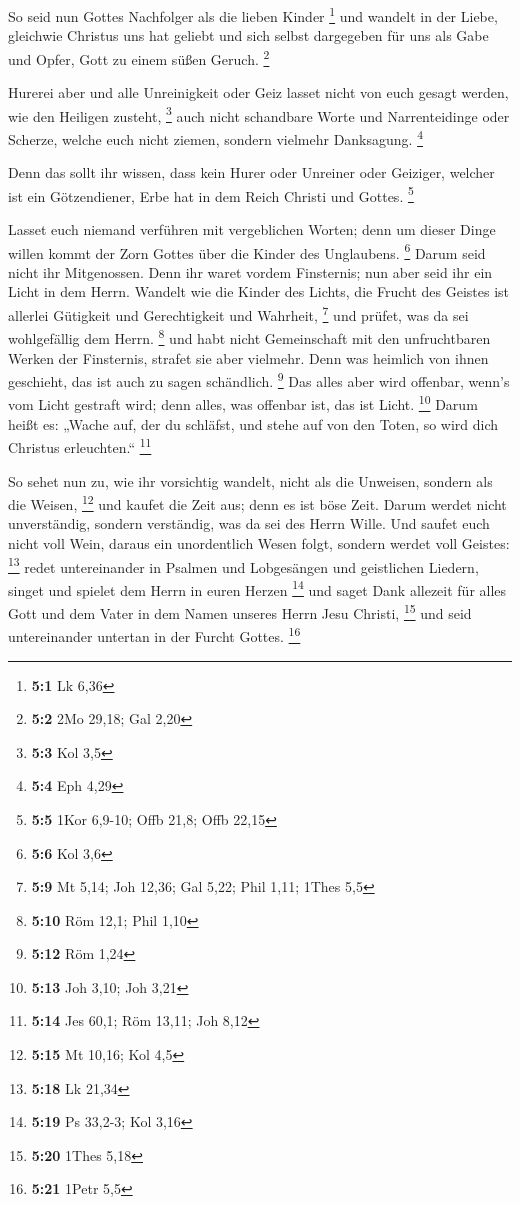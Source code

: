  So seid nun Gottes Nachfolger als die lieben Kinder
\footnote{\textbf{5:1} Lk 6,36}  und wandelt in der Liebe,
gleichwie Christus uns hat geliebt und sich selbst dargegeben für uns
als Gabe und Opfer, Gott zu einem süßen Geruch. \footnote{\textbf{5:2}
  2Mo 29,18; Gal 2,20}

 Hurerei aber und alle Unreinigkeit oder Geiz lasset nicht
von euch gesagt werden, wie den Heiligen zusteht, \footnote{\textbf{5:3}
  Kol 3,5}  auch nicht schandbare Worte und Narrenteidinge
oder Scherze, welche euch nicht ziemen, sondern vielmehr Danksagung.
\footnote{\textbf{5:4} Eph 4,29}

 Denn das sollt ihr wissen, dass kein Hurer oder Unreiner
oder Geiziger, welcher ist ein Götzendiener, Erbe hat in dem Reich
Christi und Gottes. \footnote{\textbf{5:5} 1Kor 6,9-10; Offb 21,8; Offb
  22,15}

 Lasset euch niemand verführen mit vergeblichen Worten;
denn um dieser Dinge willen kommt der Zorn Gottes über die Kinder des
Unglaubens. \footnote{\textbf{5:6} Kol 3,6}  Darum seid
nicht ihr Mitgenossen.  Denn ihr waret vordem Finsternis;
nun aber seid ihr ein Licht in dem Herrn.  Wandelt wie die
Kinder des Lichts, die Frucht des Geistes ist allerlei Gütigkeit und
Gerechtigkeit und Wahrheit, \footnote{\textbf{5:9} Mt 5,14; Joh 12,36;
  Gal 5,22; Phil 1,11; 1Thes 5,5}  und prüfet, was da sei
wohlgefällig dem Herrn. \footnote{\textbf{5:10} Röm 12,1; Phil 1,10}
 und habt nicht Gemeinschaft mit den unfruchtbaren Werken
der Finsternis, strafet sie aber vielmehr.  Denn was
heimlich von ihnen geschieht, das ist auch zu sagen schändlich.
\footnote{\textbf{5:12} Röm 1,24}  Das alles aber wird
offenbar, wenn's vom Licht gestraft wird; denn alles, was offenbar ist,
das ist Licht. \footnote{\textbf{5:13} Joh 3,10; Joh 3,21}
 Darum heißt es: „Wache auf, der du schläfst, und stehe
auf von den Toten, so wird dich Christus erleuchten.`` \footnote{\textbf{5:14}
  Jes 60,1; Röm 13,11; Joh 8,12}

 So sehet nun zu, wie ihr vorsichtig wandelt, nicht als
die Unweisen, sondern als die Weisen, \footnote{\textbf{5:15} Mt 10,16;
  Kol 4,5}  und kaufet die Zeit aus; denn es ist böse
Zeit.  Darum werdet nicht unverständig, sondern
verständig, was da sei des Herrn Wille.  Und saufet euch
nicht voll Wein, daraus ein unordentlich Wesen folgt, sondern werdet
voll Geistes: \footnote{\textbf{5:18} Lk 21,34}  redet
untereinander in Psalmen und Lobgesängen und geistlichen Liedern, singet
und spielet dem Herrn in euren Herzen \footnote{\textbf{5:19} Ps 33,2-3;
  Kol 3,16}  und saget Dank allezeit für alles Gott und
dem Vater in dem Namen unseres Herrn Jesu Christi, \footnote{\textbf{5:20}
  1Thes 5,18}  und seid untereinander untertan in der
Furcht Gottes. \footnote{\textbf{5:21} 1Petr 5,5}

